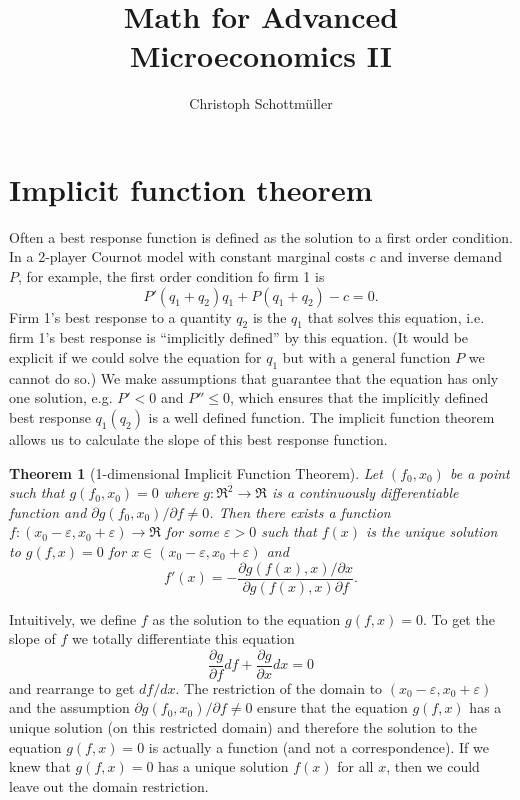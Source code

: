 \documentclass[a4paper,12pt]{article}
\title{Math for Advanced Microeconomics II}
\author{Christoph Schottm\"uller}
\newtheorem{theorem}{Theorem}
\begin{document}
\maketitle

\section{Implicit function theorem}
\label{sec:impl-funct-theor}

Often a best response function is defined as the solution to a first order condition. In a 2-player Cournot model with constant marginal costs $c$ and inverse demand $P$, for example, the first order condition fo firm 1 is
\begin{equation*}
  P'(q_1+q_2)q_1+P(q_1+q_2)-c=0.
\end{equation*}
Firm 1's best response to a quantity $q_2$ is the $q_1$ that solves this equation, i.e. firm 1's best response is ``implicitly defined'' by this equation. (It would be explicit if we could solve the equation for $q_1$ but with a general function $P$ we cannot do so.) We make assumptions that guarantee that the equation has only one solution, e.g. $P'<0$ and $P''\leq 0$, which ensures that the implicitly defined best response $q_1(q_2)$ is a well defined function. The implicit function theorem allows us to calculate the slope of this best response function.

\begin{theorem}[1-dimensional Implicit Function Theorem]
  Let $(f_0,x_0)$ be a point such that $g(f_0,x_0)=0$ where $g:\Re^2\rightarrow\Re$ is a continuously differentiable function and $\partial g(f_0,x_0)/\partial f\neq 0$. Then there exists a function $f:(x_0-\varepsilon ,x_0+\varepsilon )\rightarrow\Re$ for some $\varepsilon >0$ such that $f(x)$ is the unique solution to $g(f,x)=0$ for $x\in(x_0-\varepsilon ,x_0+\varepsilon )$ and
  \begin{equation*}
    f'(x)=-\frac{\partial g(f(x),x)/\partial x}{\partial g(f(x),x)\partial f}.
  \end{equation*}
\end{theorem}

Intuitively, we define $f$ as the solution to the equation $g(f,x)=0$. To get the slope of $f$ we totally differentiate this equation
\begin{equation*}
  \frac{\partial g}{\partial f}df+\frac{\partial g}{\partial x}dx=0
\end{equation*}
and rearrange to get $df/dx$. The restriction of the domain to $(x_0-\varepsilon, x_0+\varepsilon )$ and the assumption $\partial g(f_0,x_0)/\partial f\neq 0$ ensure that the equation $g(f,x)$ has a unique solution (on this restricted domain) and therefore the solution to the equation $g(f,x)=0$ is  actually  a function (and not a correspondence). If we knew that $g(f,x)=0$ has a unique solution $f(x)$ for all $x$, then we could leave out the domain restriction.
\end{document}

